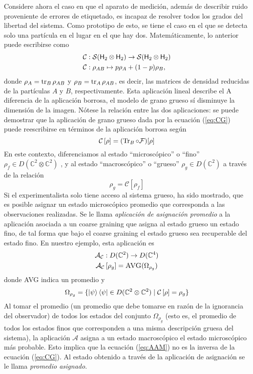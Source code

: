 \documentclass[onecolumn,11pt]{article}
\newcommand{\mcS}{\mathcal{S}}
\newcommand{\hilbert}{{\sf H}}
\newcommand{\mcF}{\mathcal{F}}
\newcommand{\mcC}{\mathcal{C}}
\newcommand{\mcA}{\mathcal{A}}
\newcommand{\Complex}{\mathbb{C}} %
\newcommand{\CG}[1]{\mcC\left[#1\right]}
\begin{document}
Considere ahora el caso en que el aparato de medición, además de describir ruido proveniente de errores de etiquetado, es incapaz de resolver todos los grados del libertad del sistema. Como prototipo de esto, se tiene el caso en el que se detecta solo una partícula en el lugar en el que hay dos. Matemáticamente, lo anterior puede escribirse como
\begin{align}
\mcC&:\mcS(\hilbert_2 \otimes \hilbert_2)\to \mcS(\hilbert_2 \otimes \hilbert_2)\nonumber\\
\mcC&: \rho_{AB} \mapsto p\rho_A+(1-p)\rho_B,
\label{eq:CG}
\end{align}
donde $\rho_A=\tr_B \rho_{AB}$ y $\rho_B=\tr_A \rho_{AB}$, es decir, las matrices de densidad reducidas de la partículas $A$ y $B$, respectivamente.
%
Esta aplicación lineal describe el 
%
A diferencia de la aplicación borrosa, el modelo de grano grueso sí disminuye la dimensión de la imagen. Nótese la relación entre las dos aplicaciones: se puede demostrar\cite{FuzzyMeasurements} que la aplicación de grano grueso dada por la ecuación (\ref{eq:CG}) puede reescribirse en términos de la aplicación borrosa según
\begin{equation}
\CG{\rho}=(\Tr_{B}\circ\mcF)[\rho]
\end{equation}
En este contexto, diferenciamos al estado ``microscópico'' o ``fino'' $\rho_{f}\in D(\Complex^{2}\otimes\Complex^{2})$ , y al estado ``macroscópico'' o ``grueso'' $\rho_{g}\in D(\Complex^{2})$ a través de la relación
\begin{equation}
    \rho_{g}=\CG{\rho_{f}}
\end{equation}
Si el experimentalista solo tiene acceso al sistema grueso, ha sido mostrado\cite{Macro-To-Micro}, que es posible asignar un estado microscópico promedio que corresponda a las observaciones realizadas. Se le llama \textit{aplicación de asignación promedio} a la aplicación asociada a un coarse graining que asigna al estado grueso un estado fino, de tal forma que bajo el coarse graining el estado grueso sea recuperable del estado fino. En nuestro ejemplo, esta aplicación es
\begin{gather}
\mcA_{\mcC}:D(\Complex^{2})\rightarrow D(\Complex^{4})\label{eq:AAMDom}\\
\mcA_{\mcC}\left[\rho_{g}\right]=\textsc{AVG}(\Omega_{\rho_{g}})\label{eq:AAM}
\end{gather}
donde \textsc{AVG} indica un promedio y
\begin{equation}
\Omega_{\rho_{g}}=\{\ket{\psi}\bra{\psi}\in D(\Complex^{2}\otimes\Complex^{2}) \mid \CG{\rho}=\rho_{g}\}
\end{equation}
Al tomar el promedio (un promedio que debe tomarse en razón de la ignorancia del observador) de todos los estados del conjunto $\Omega_{\rho_{g}}$ (esto es, el promedio de todos los estados finos que corresponden a una misma descripción gruesa del sistema), la aplicación $\mcA$ asigna a un estado macroscópico el estado microscópico más probable. Esto implica que la ecuación (\ref{eq:AAM}) no es la inversa de la ecuación (\ref{eq:CG}). Al estado obtenido a través de la aplicación de asignación se le llama \textit{promedio asignado}.
\vspace{0.5cm}
\end{document}
